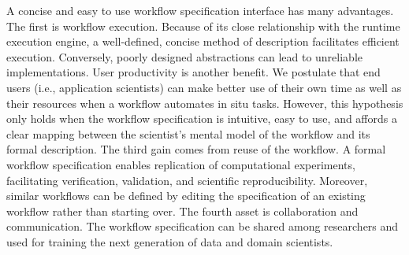 \begin{refsection}
A concise and easy to use workflow specification interface has many advantages. The first is workflow execution. Because of its close relationship with the runtime execution engine, a well-defined, concise method of description facilitates efficient execution. Conversely, poorly designed abstractions can lead to unreliable implementations. User productivity is another benefit. We postulate that end users (i.e., application scientists) can make better use of their own time as well as their resources when a workflow automates in situ tasks. However, this hypothesis only holds when the workflow specification is intuitive, easy to use, and affords a clear mapping between the scientist’s mental model of the workflow and its formal description. The third gain comes from reuse of the workflow. A formal workflow specification enables replication of computational experiments, facilitating verification, validation, and scientific  reproducibility. Moreover, similar workflows can be defined by editing the specification of an existing workflow rather than starting over. The fourth asset is collaboration and communication. The workflow specification can be shared among researchers and used for training the next generation of data and domain scientists.

\printbibliography
\end{refsection}

